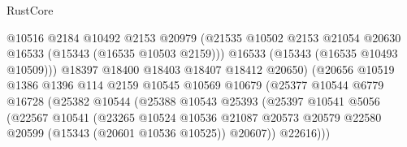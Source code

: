 \begin{lexlean}{RustCore}
\begin{coremodule}
                                      @10516
                                      @2184
                                      @10492
                                      @2153
                                      @20979
                                      (@21535
                                        @10502
                                        @2153
                                        @21054
                                        @20630
                                        @16533
                                        (@15343 (@16535 @10503 @2159)))
                                      @16533
                                      (@15343 (@16535 @10493 @10509)))
                                    @18397
                                    @18400
                                    @18403
                                    @18407
                                    @18412
                                    @20650)
                                  (@20656
                                    @10519
                                    @1386
                                    @1396
                                    @114
                                    @2159
                                    @10545
                                    @10569
                                    @10679
                                    (@25377
                                      @10544
                                      @6779
                                      @16728
                                      (@25382
                                        @10544
                                        (@25388
                                          @10543
                                          @25393
                                          (@25397
                                            @10541
                                            @5056
                                            (@22567
                                              @10541
                                              (@23265
                                                @10524
                                                @10536
                                                @21087
                                                @20573
                                                @20579
                                                @22580
                                                @20599
                                                (@15343 (@20601 @10536 @10525))
                                                @20607))
                                            @22616)))

\end{coremodule}
\end{lexlean}
